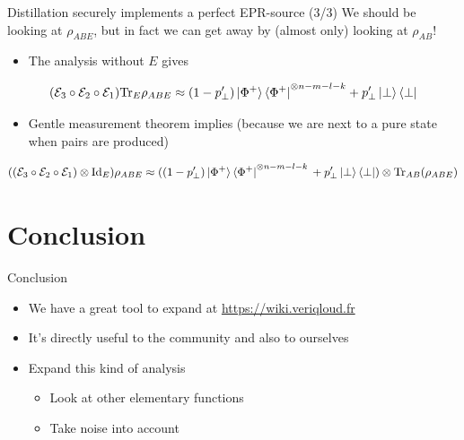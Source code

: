 \documentclass[presentation]{beamer}
\begin{document}
\begin{frame}[label={sec:orgaaed667}]{Distillation securely implements a perfect EPR-source (3/3)}
We should be looking at \(\rho_{ABE}\), but in fact we can get away by (almost only) looking at \(\rho_{AB}\)!

\begin{itemize}
\item The analysis without \(E\) gives
\end{itemize}
$$( \mathcal{E}_3 \circ \mathcal E_2 \circ \mathcal E_1)  \text{Tr}_E \rho_{ABE} \approx (1-p_\perp') \ket{\Phi^+}\bra{\Phi^+} ^{\otimes n-m-l-k} + p_\perp' \ket{\perp}\bra{\perp}$$

\begin{itemize}
\item Gentle measurement theorem implies (because we are next to a \alert{pure} state when pairs are produced)
\end{itemize}
$$((\mathcal{E}_3 \circ \mathcal E_2 \circ \mathcal E_1) \otimes \text{Id}_E) \rho_{ABE} \approx ((1-p_\perp') \ket{\Phi^+}\bra{\Phi^+} ^{\otimes n-m-l-k} \\+ p_\perp' \ket{\perp}\bra{\perp})\otimes \text{Tr}_{AB} (\rho_{ABE})$$
\end{frame}


\section{Conclusion}
\label{sec:org903d847}

\begin{frame}[label={sec:orgfa0b704}]{Conclusion}
\begin{itemize}
\item We have a great tool to expand at \url{https://wiki.veriqloud.fr}
\item It's directly useful to the community and also to ourselves
\item Expand this kind of analysis
\begin{itemize}
\item Look at other elementary functions
\item Take noise into account
\end{itemize}
\end{itemize}
\end{frame}
\end{document}
